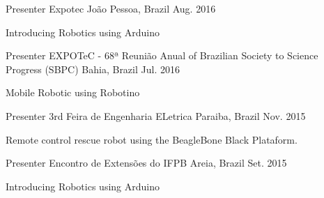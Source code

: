 

\begin{cventries}

  \cventry
    {Presenter} %
    {Expotec} %
    {João Pessoa, Brazil} %
    {Aug. 2016} %
    {
      \begin{cvitems} %
        \item {Introducing Robotics using Arduino}
      \end{cvitems}
    }

  \cventry
    {Presenter} %
    {EXPOTeC - 68ª Reunião Anual of Brazilian Society to Science Progress (SBPC)} %
    {Bahia, Brazil} %
    {Jul. 2016} %
    {
      \begin{cvitems} %
        \item {Mobile Robotic using Robotino}
      \end{cvitems}
    }

  \cventry
    {Presenter} %
    {3rd Feira de Engenharia ELetrica} %
    {Paraiba, Brazil} %
    {Nov. 2015} %
    {
      \begin{cvitems} %
        \item {Remote control rescue robot using the BeagleBone Black Plataform.}
      \end{cvitems}
    }
    
  \cventry
    {Presenter} %
    {Encontro de Extensões do IFPB} %
    {Areia, Brazil} %
    {Set. 2015} %
    {
      \begin{cvitems} %
        \item {Introducing Robotics using Arduino}
      \end{cvitems}
    }
    
   



\end{cventries}

